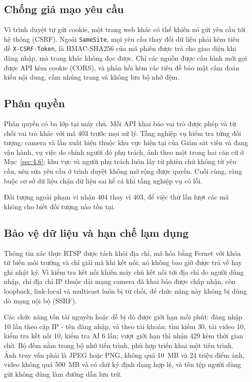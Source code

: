 \subsection{Chống giả mạo yêu cầu}
\label{sec:5.5.2}

Vì trình duyệt tự gửi cookie, một trang web khác có thể khiến nó gửi yêu cầu tới hệ thống (CSRF). Ngoài \texttt{SameSite}, mọi yêu cầu thay đổi dữ liệu phải kèm tiêu đề \texttt{X-CSRF-Token}, là HMAC-SHA256 của mã phiên được trả cho giao diện khi đăng nhập, mà trang khác không đọc được. Chỉ các nguồn được cấu hình mới gọi được API kèm cookie (CORS), và phản hồi kèm các tiêu đề bảo mật cấm đoán kiểu nội dung, cấm nhúng trang và không lưu bộ nhớ đệm.

\subsection{Phân quyền}
\label{sec:5.5.3}

Phân quyền có ba lớp tại máy chủ. Mỗi API khai báo vai trò được phép và từ chối vai trò khác với mã 403 trước mọi xử lý. Tầng nghiệp vụ kiểm tra từng đối tượng: camera và lần xuất hiện thuộc khu vực hiện tại của Giám sát viên và đang vận hành, vụ việc do chính người đó phụ trách, ảnh theo một trong hai căn cứ ở Mục~\ref{sec:4.6}; khu vực và người phụ trách luôn lấy từ phiên chứ không từ yêu cầu, nên sửa yêu cầu ở trình duyệt không mở rộng được quyền. Cuối cùng, ràng buộc cơ sở dữ liệu chặn dữ liệu sai kể cả khi tầng nghiệp vụ có lỗi.

Đối tượng ngoài phạm vi nhận 404 thay vì 403, để việc thử lần lượt các mã không cho biết đối tượng nào tồn tại.

\subsection{Bảo vệ dữ liệu và hạn chế lạm dụng}
\label{sec:5.5.4}

Thông tin xác thực RTSP được tách khỏi địa chỉ, mã hóa bằng Fernet với khóa từ biến môi trường và chỉ giải mã khi kết nối; nó không bao giờ được trả về hay ghi nhật ký. Vì kiểm tra kết nối khiến máy chủ kết nối tới địa chỉ do người dùng nhập, chỉ địa chỉ IP thuộc dải mạng camera đã khai báo được chấp nhận, còn loopback, link-local và multicast luôn bị từ chối, để chức năng này không bị dùng dò mạng nội bộ (SSRF).

Các chức năng tốn tài nguyên hoặc dễ bị dò được giới hạn mỗi phút: đăng nhập 10 lần theo cặp IP - tên đăng nhập, và theo tài khoản: tìm kiếm 30, tải video 10, kiểm tra kết nối 10, kiểm tra AI 6 lần; vượt giới hạn thì nhận 429 kèm thời gian chờ. Bộ đếm nằm trong bộ nhớ tiến trình, phù hợp triển khai một tiến trình. Ảnh truy vấn phải là JPEG hoặc PNG, không quá 10~MB và 24 triệu điểm ảnh, video không quá 500~MB và có chữ ký định dạng hợp lệ, và tên tệp người dùng gửi không dùng làm đường dẫn lưu trữ.
